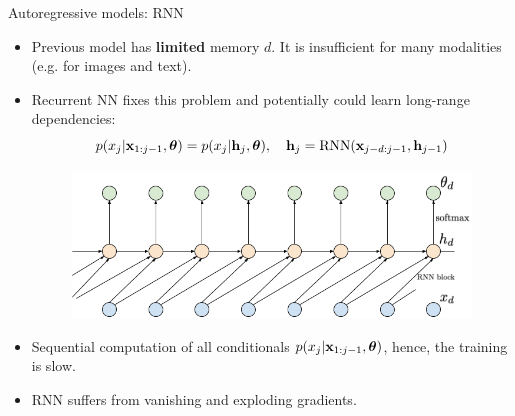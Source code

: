 \begin{frame}{Autoregressive models: RNN}
	\begin{itemize}
		\item Previous model has \textbf{limited} memory $d$. It is insufficient for many modalities (e.g. for images and text). 
		\item Recurrent NN fixes this problem and potentially could learn long-range dependencies:
		\[
			p(x_j | \mathbf{x}_{1:j - 1}, \boldsymbol{\theta}) = p(x_j | \mathbf{h}_j, \boldsymbol{\theta}), \quad \mathbf{h}_j = \text{RNN}(\mathbf{x}_{j-d:j - 1}, \mathbf{h}_{j - 1})
		\]
		 \begin{figure}
	    \centering
	    \includegraphics[width=0.7\linewidth]{figs/sequential_RNN}
		 \end{figure}
		\item Sequential computation of all conditionals $p(x_j | \mathbf{x}_{1:j-1}, \boldsymbol{\theta})$, hence, the training is slow.
		\item RNN suffers from vanishing and exploding gradients.
	\end{itemize}
\end{frame}
